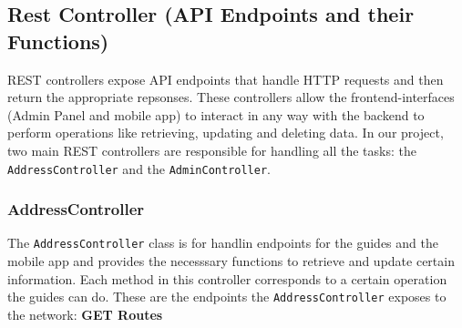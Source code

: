     \subsection{Rest Controller (API Endpoints and their Functions)}
    REST controllers expose API endpoints that handle HTTP requests and then return the appropriate repsonses. These controllers allow the frontend-interfaces (Admin Panel and mobile app) to interact in any way with the backend to perform operations like retrieving, updating and deleting data. In our project, two main REST controllers are responsible for handling all the tasks: the \texttt{AddressController} and the \texttt{AdminController}.

    \subsubsection{AddressController}
    The \texttt{AddressController} class is for handlin endpoints for the guides and the mobile app and provides the necesssary functions to retrieve and update certain information. Each method in this controller corresponds to a certain operation the guides can do. These are the endpoints the \texttt{AddressController} exposes to the network: \newline \newline
    \textbf{GET Routes} 
